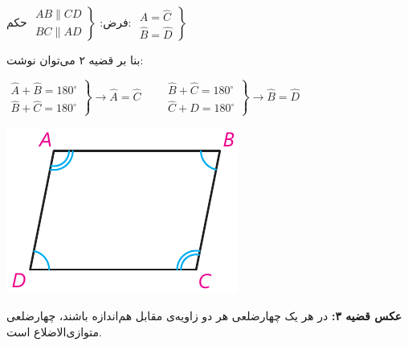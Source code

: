 \documentclass[12pt, a4paper]{book}
\begin{document}
\begin{minipage}{.68\textwidth}
	\centering فرض: 
	$\left.
	\begin{array}{rrr}
		AB \parallel CD \\
		BC \parallel AD
	\end{array}
	\right\}$
	\qquad حکم:
	$ \left. 
	\begin{array}{rrr}
		\widehat{A} = \widehat{C} \\
		\widehat{B} = \widehat{D}
	\end{array}
 \right\}$
 \begin{flushright}
 	 بنا بر قضیه ۲ می‌توان نوشت:
 \end{flushright}
	\begin{flushleft}
		$ \left.
		\begin{array}{rrr} 
			\widehat{A} + \widehat{B} = 180^{\circ} \\
			\widehat{B} + \widehat{C} = 180^{\circ}
		\end{array}
	 \right\}
	 \rightarrow \widehat{A} = \widehat{C}
	 \qquad
	  \left.
	  \begin{array}{rrr} 
	  	\widehat{B} + \widehat{C} = 180^{\circ} \\
	  	\widehat{C} + \widehat{D} = 180^{\circ}
	  \end{array}
	  \right\}
	  \rightarrow \widehat{B} = \widehat{D}$
	\end{flushleft}
\end{minipage}
\begin{minipage}{.28\textwidth}
	\begin{flushleft}
		\includegraphics{"Shapes/Fasl - 3/Dars 1/qazie 3.pdf"}
	\end{flushleft}
\end{minipage}
\newline \bigskip \bigskip

\textbf{عکس قضیه ۳:} در هر یک چهارضلعی هر دو زاویه‌ی مقابل هم‌اندازه باشند، چهارضلعی متوازی‌الاضلاع است.
\end{document}
